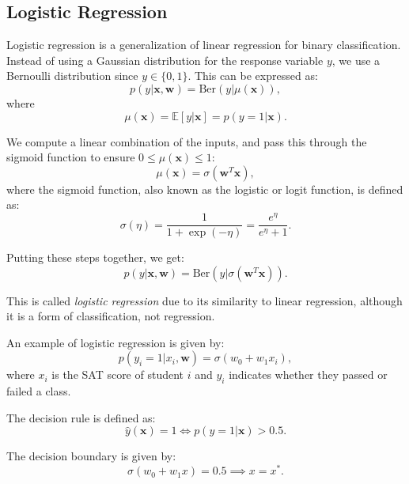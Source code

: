 \subsection{Logistic Regression}

Logistic regression is a generalization of linear regression for binary classification. Instead of using a Gaussian distribution for the response variable \( y \), we use a Bernoulli distribution since \( y \in \{0, 1\} \). This can be expressed as:
\begin{equation}
    p(y|\mathbf{x}, \mathbf{w}) = \text{Ber}(y|\mu(\mathbf{x})),
\end{equation}
where
\begin{equation}
    \mu(\mathbf{x}) = \mathbb{E}[y|\mathbf{x}] = p(y = 1|\mathbf{x}).
\end{equation}

We compute a linear combination of the inputs, and pass this through the sigmoid function to ensure \( 0 \leq \mu(\mathbf{x}) \leq 1 \):
\begin{equation}
    \mu(\mathbf{x}) = \sigma(\mathbf{w}^T \mathbf{x}),
\end{equation}
where the sigmoid function, also known as the logistic or logit function, is defined as:
\begin{equation}
    \sigma(\eta) = \frac{1}{1 + \exp(-\eta)} = \frac{e^\eta}{e^\eta + 1}.
\end{equation}

Putting these steps together, we get:
\begin{equation}
    p(y|\mathbf{x}, \mathbf{w}) = \text{Ber}(y|\sigma(\mathbf{w}^T \mathbf{x})).
\end{equation}

This is called \textit{logistic regression} due to its similarity to linear regression, although it is a form of classification, not regression.

An example of logistic regression is given by:
\begin{equation}
    p(y_i = 1|x_i, \mathbf{w}) = \sigma(w_0 + w_1 x_i),
\end{equation}
where \( x_i \) is the SAT score of student \( i \) and \( y_i \) indicates whether they passed or failed a class.

The decision rule is defined as:
\begin{equation}
    \hat{y}(\mathbf{x}) = 1 \iff p(y = 1|\mathbf{x}) > 0.5.
\end{equation}

The decision boundary is given by:
\begin{equation}
    \sigma(w_0 + w_1 x) = 0.5 \implies x = x^*.
\end{equation}

